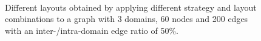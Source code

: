 {\begin{figure}[p]
\begin{adjustwidth}{0cm}{-1cm}
{    }\\[5mm]
  \end{adjustwidth}  
  \caption[Different layouts for a graph with 3 domains, 60 nodes and 200 edges with a inter-/intra-domain edge ratio of 50\%.]{Different layouts obtained by applying different strategy and layout combinations to a graph with 3 domains, 60 nodes and 200 edges with an inter-/intra-domain edge ratio of 50\%.}%
  \label{fig:ex2}
\end{figure}
  \cleartoodd
}

